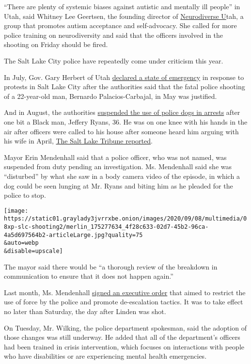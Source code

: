 ``There are plenty of systemic biases against autistic and mentally ill
people'' in Utah, said Whitney Lee Geertsen, the founding director of
\href{https://www.facebookcorewwwi.onion/neurodiverseutah/}{Neurodiverse
U}tah, a group that promotes autism acceptance and self-advocacy. She
called for more police training on neurodiversity and said that the
officers involved in the shooting on Friday should be fired.

The Salt Lake City police have repeatedly come under criticism this
year.

In July, Gov. Gary Herbert of Utah
\href{https://www.nytimes3xbfgragh.onion/2020/07/10/us/utah-state-of-emergency.html}{declared
a state of emergency} in response to protests in Salt Lake City after
the authorities said that the fatal police shooting of a 22-year-old
man, Bernardo Palacios-Carbajal, in May was justified.

And in August, the authorities
\href{https://www.nytimes3xbfgragh.onion/2020/08/13/us/salt-lake-city-police-dog.html}{suspended
the use of police dogs in arrests} after one bit a Black man, Jeffery
Ryans, 36. He was on one knee with his hands in the air after officers
were called to his house after someone heard him arguing with his wife
in April,
\href{https://www.sltrib.com/news/2020/08/11/salt-lake-city-police-dog/}{The
Salt Lake Tribune reported}.

Mayor Erin Mendenhall said that a police officer, who was not named, was
suspended from duty pending an investigation. Ms. Mendenhall said she
was ``disturbed'' by what she saw in a body camera video of the episode,
in which a dog could be seen lunging at Mr. Ryans and biting him as he
pleaded for the police to stop.

\texttt{[image: https://static01.graylady3jvrrxbe.onion/images/2020/09/08/multimedia/08xp-slc-shooting2/merlin\_175277634\_4f28c633-02d7-45b2-96ca-4a5d697564b2-articleLarge.jpg?quality=75\\\&auto=webp\\\&disable=upscale]}

The mayor said there would be ``a thorough review of the breakdown in
communication to ensure that it does not happen again.''

Last month, Ms. Mendenhall
\href{https://www.slc.gov/mayor/2020/08/03/mayor-mendenhall-slcpd-chief-mike-brown-announce-substantive-policy-changes/}{signed
an executive order} that aimed to restrict the use of force by the
police and promote de-escalation tactics. It was to take effect no later
than Saturday, the day after Linden was shot.

On Tuesday, Mr. Wilking, the police department spokesman, said the
adoption of those changes was still underway. He added that all of the
department's officers had been trained in crisis intervention, which
focuses on interactions with people who have disabilities or are
experiencing mental health emergencies.

